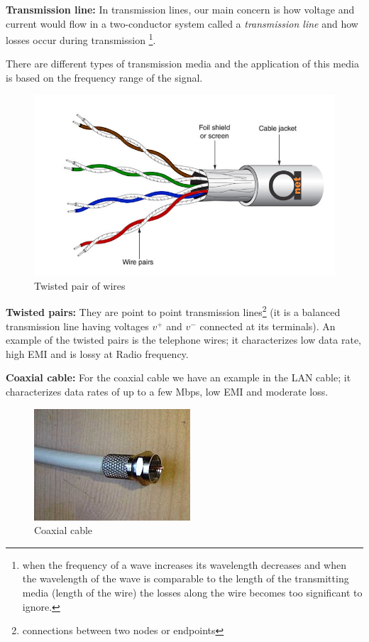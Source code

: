 \textbf{Transmission line:} In transmission lines, our main concern is how voltage and current would flow in a two-conductor system called a \textit{transmission line} and how losses occur during transmission \footnote{when the frequency of a wave increases its wavelength decreases and when the wavelength of the wave is comparable to the length of the transmitting media (length of the wire) the losses along the wire becomes too significant to ignore.}.

There are different types of transmission media and the application of this media is based on the frequency range of the signal. \begin{figure}[h]
\centering
\includegraphics[width=1\linewidth]{./graphics/twistedpairs}
\caption{Twisted pair of wires}
\end{figure} 

\textbf{Twisted pairs:} They are point to point transmission lines\footnote{connections between two nodes or endpoints} (it is a balanced transmission line having voltages $v^{+}$ and $v^{-}$ connected at its terminals). An example of the twisted pairs is the telephone wires; it characterizes low data rate, high EMI and is lossy at Radio frequency.

\textbf{Coaxial cable:} For the coaxial cable we have an example in the LAN cable; it characterizes data rates of up to a few Mbps, low EMI and moderate loss.
\begin{figure}[h]
\centering
\includegraphics[scale=0.4]{./graphics/coaxialcable}
\caption{Coaxial cable}
\end{figure}

